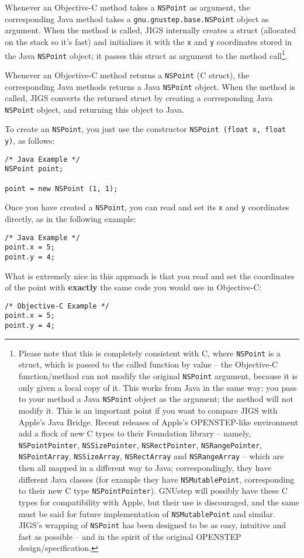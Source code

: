 Whenever an Objective-C method takes a \texttt{NSPoint} as argument,
the corresponding Java method takes a
\texttt{gnu.gnustep.base.NSPoint} object as argument.  When the method 
is called, JIGS internally creates a struct (allocated on the stack so
it's fast) and initializes it with the \texttt{x} and \texttt{y}
coordinates stored in the Java \texttt{NSPoint} object; it passes this
struct as argument to the method call\footnote{Please note that this
is completely consistent with C, where \texttt{NSPoint} is a struct,
which is passed to the called function by value -- the Objective-C
function/method can not modify the original
\texttt{NSPoint} argument, because it is only given a local copy of
it.  This works from Java in the same way: you pass to your method a
Java \texttt{NSPoint} object as the argument; the method will not
modify it.  This is an important point if you want to compare JIGS
with Apple's Java Bridge.  Recent releases of Apple's OPENSTEP-like
environment add a flock of new C types to their Foundation library --
namely, \texttt{NSPointPointer}, \texttt{NSSizePointer},
\texttt{NSRectPointer}, \texttt{NSRangePointer}, \texttt{NSPointArray}, 
\texttt{NSSizeArray}, \texttt{NSRectArray} and \texttt{NSRangeArray}  
-- which are then all mapped in a different way to Java;
correspondingly, they have different Java classes (for example they
have \texttt{NSMutablePoint}, corresponding to their new C type
\texttt{NSPointPointer}).  GNUstep will possibly have these C types 
for compatibility with Apple, but their use is discouraged, and the
same must be said for future implementation of \texttt{NSMutablePoint}
and similar.  JIGS's wrapping of \texttt{NSPoint} has been designed to
be as easy, intuitive and fast as possible -- and in the spirit of the
original OPENSTEP design/specification.}.

Whenever an Objective-C method returns a \texttt{NSPoint} (C struct),
the corresponding Java methods returns a Java \texttt{NSPoint} object.
When the method is called, JIGS converts the returned struct by
creating a corresponding Java \texttt{NSPoint} object, and returning
this object to Java.

To create an \texttt{NSPoint}, you just use the constructor
\texttt{NSPoint (float x, float y)}, as follows:
\begin{verbatim}
/* Java Example */
NSPoint point;

point = new NSPoint (1, 1);
\end{verbatim}
Once you have created a \texttt{NSPoint}, you can read and set its
\texttt{x} and \texttt{y} coordinates directly, as in the following
example:
\begin{verbatim}
/* Java Example */
point.x = 5;
point.y = 4;
\end{verbatim}
What is extremely nice in this approach is that you read and set the
coordinates of the point with {\bf exactly} the same code you would
use in Objective-C:
\begin{verbatim}
/* Objective-C Example */
point.x = 5;
point.y = 4;
\end{verbatim}

